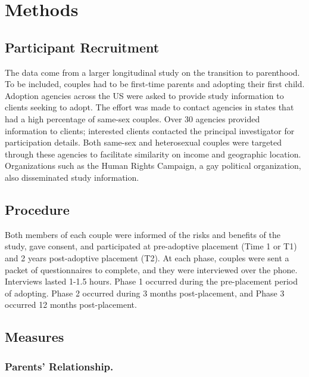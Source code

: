 \documentclass[man]{apa6}
\begin{document}
\hypertarget{methods}{%
\section{Methods}\label{methods}}

\hypertarget{participant-recruitment}{%
\subsection{Participant Recruitment}\label{participant-recruitment}}

The data come from a larger longitudinal study on the transition to parenthood. To be included, couples had to be first-time parents and adopting their first child. Adoption agencies across the US were asked to provide study information to clients seeking to adopt. The effort was made to contact agencies in states that had a high percentage of same-sex couples. Over 30 agencies provided information to clients; interested clients contacted the principal investigator for participation details. Both same-sex and heterosexual couples were targeted through these agencies to facilitate similarity on income and geographic location. Organizations such as the Human Rights Campaign, a gay political organization, also disseminated study information.

\hypertarget{procedure}{%
\subsection{Procedure}\label{procedure}}

Both members of each couple were informed of the risks and benefits of the study, gave consent, and participated at pre-adoptive placement (Time 1 or T1) and 2 years post-adoptive placement (T2). At each phase, couples were sent a packet of questionnaires to complete, and they were interviewed over the phone. Interviews lasted 1-1.5 hours. Phase 1 occurred during the pre-placement period of adopting. Phase 2 occurred during 3 months post-placement, and Phase 3 occurred 12 months post-placement.

\hypertarget{measures}{%
\subsection{Measures}\label{measures}}

\hypertarget{parents-relationship.}{%
\subsubsection{Parents' Relationship.}\label{parents-relationship.}}
\end{document}
